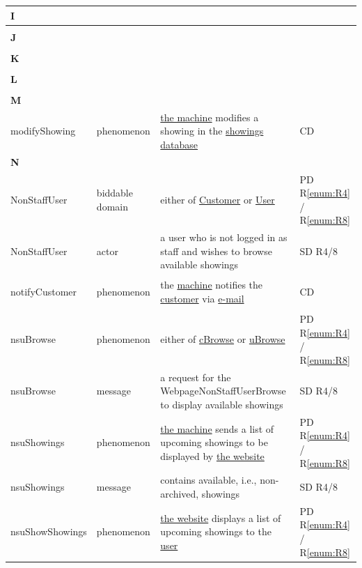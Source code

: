 \documentclass[a4paper,10pt,titlepage,bibtotoc,bibtotocnumbered]{scrreprt}
\begin{document}
\begin{longtable}{|l|p{3cm}|p{5cm}|l|}
\hline
\multicolumn{4}{|l|}{\textbf{I}}\\
\hline
&  &  & \\
\hline
\multicolumn{4}{|l|}{\textbf{J}}\\
\hline
&  &  & \\
\hline
\multicolumn{4}{|l|}{\textbf{K}}\\
\hline
&  &  & \\
\hline
\multicolumn{4}{|l|}{\textbf{L}}\\
&  &  & \\
\hline
\multicolumn{4}{|l|}{\textbf{M}}\\
\hline
\hypertarget{glossary:modifyShowing}{modifyShowing} & phenomenon & \hyperlink{glossary:UDEKino}{the machine} modifies a showing in the \hyperlink{glossary:ShowingsDatabase}{showings database} & CD\\
\hline
\multicolumn{4}{|l|}{\textbf{N}}\\
\hline
\hypertarget{glossary:NonStaffUser}{NonStaffUser} & biddable domain & either of \hyperlink{glossary:Customer}{Customer} or \hyperlink{glossary:User}{User} & PD R\ref{enum:R4} / R\ref{enum:R8}\\
\hline
NonStaffUser & actor & a user who is not logged in as staff and wishes to browse available showings & SD R4/8\\
\hline
\hypertarget{glossary:notifyCustomer}{notifyCustomer} & phenomenon & the \hyperlink{glossary:UDEKino}{machine} notifies the \hyperlink{glossary:Customer}{customer} via \hyperlink{glossary:Email}{e-mail} & CD\\
\hline
\hypertarget{glossary:nsuBrowse}{nsuBrowse} & phenomenon & either of \hyperlink{glossary:cBrowse}{cBrowse} or \hyperlink{glossary:uBrowse}{uBrowse} & PD R\ref{enum:R4} / R\ref{enum:R8}\\
\hline
nsuBrowse & message & a request for the WebpageNonStaffUserBrowse to display available showings & SD R4/8\\
\hline
\hypertarget{glossary:nsuShowings}{nsuShowings} & phenomenon & \hyperlink{glossary:UDEK-NonStaffUserBrowse}{the machine} sends a list of upcoming showings to be displayed by \hyperlink{glossary:WebPageNonStaffUserBrowse}{the website} & PD R\ref{enum:R4} / R\ref{enum:R8}\\
\hline
nsuShowings & message & contains available, i.e., non-archived, showings & SD R4/8\\
\hline
\hypertarget{glossary:nsuShowShowings}{nsuShowShowings} & phenomenon & \hyperlink{glossary:WebPageNonStaffUserBrowse}{the website} displays a list of upcoming showings to the \hyperlink{glossary:NonStaffUser}{user} & PD R\ref{enum:R4} / R\ref{enum:R8}\\

\end{longtable}
\end{document}
